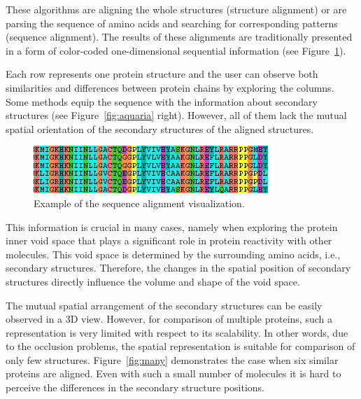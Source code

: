 \documentclass[twocolumn]{bmcart}%
\begin{document}
These algorithms are aligning the whole structures (structure alignment) or are parsing the sequence of amino acids and searching for corresponding patterns (sequence alignment). 
The results of these alignments are traditionally presented in a form of color-coded one-dimensional sequential information (see Figure~\ref{fig:align}).

Each row represents one protein structure and the user can observe both similarities and differences between protein chains by exploring the columns.
Some methods equip the sequence with the information about secondary structures (see Figure~\ref{fig:aquaria} right).
However, all of them lack the mutual spatial orientation of the secondary structures of the aligned structures.

\begin{figure}[ht]
  \centering
  \includegraphics[width=0.9\columnwidth]{pics/align.png}
  \caption{Example of the sequence alignment visualization.}
  \label{fig:align}
\end{figure}

This information is crucial in many cases, namely when exploring the protein inner void space that plays a significant role in protein reactivity with other molecules.
This void space is determined by the surrounding amino acids, i.e., secondary structures. 
Therefore, the changes in the spatial position of secondary structures directly influence the volume and shape of the void space.



The mutual spatial arrangement of the secondary structures can be easily observed in a 3D view. 
However, for comparison of multiple proteins, such a representation is very limited with respect to its scalability.
In other words, due to the occlusion problems, the spatial representation is suitable for comparison of only few structures. 
Figure~\ref{fig:many} demonstrates the case when six similar proteins are aligned.
Even with such a small number of molecules it is hard to perceive the differences in the secondary structure positions.

\end{document}
